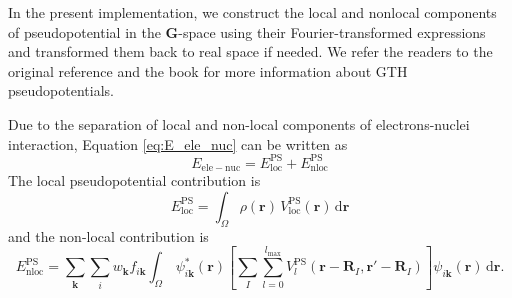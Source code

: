 In the present implementation, we construct the local and nonlocal
components of pseudopotential in the $\mathbf{G}$-space using
their Fourier-transformed expressions
and transformed them back to real space if needed.
We refer the readers to the original
reference \cite{Goedecker1996} and the book \cite{Marx2009}
for more information about GTH pseudopotentials.

Due to the separation of local and non-local components of electrons-nuclei
interaction, Equation \eqref{eq:E_ele_nuc} can be written as
\begin{equation}
E_{\mathrm{ele-nuc}} = E^{\mathrm{PS}}_{\mathrm{loc}}
+ E^{\mathrm{PS}}_{\mathrm{nloc}}
\end{equation}
%
The local pseudopotential contribution is
\begin{equation}
E^{\mathrm{PS}}_{\mathrm{loc}} =
\int_{\Omega} \rho(\mathbf{r})\,V^{\mathrm{PS}}_{\mathrm{loc}}(\mathbf{r})\,
\mathrm{d}\mathbf{r}
\end{equation}
%
and the non-local contribution is
\begin{equation}
E^{\mathrm{PS}}_{\mathrm{nloc}} = 
\sum_{\mathbf{k}}
\sum_{i}
w_{\mathbf{k}}
f_{i\mathbf{k}}
\int_{\Omega}\,
\psi^{*}_{i\mathbf{k}}(\mathbf{r})
\left[
\sum_{I}\sum_{l=0}^{l_{\mathrm{max}}}
V^{\mathrm{PS}}_{l}(\mathbf{r}-\mathbf{R}_{I},\mathbf{r}'-\mathbf{R}_{I})
\right]
\psi_{i\mathbf{k}}(\mathbf{r})
\,\mathrm{d}\mathbf{r}.
\end{equation}